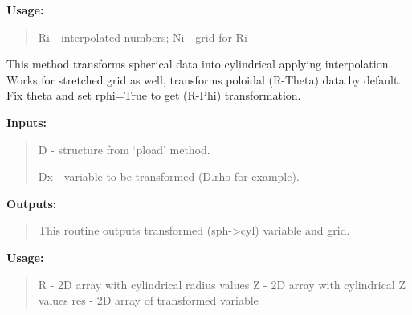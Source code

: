 \documentclass[letterpaper,10pt,english]{sphinxmanual}
\begin{document}
\begin{fulllineitems}
\begin{fulllineitems}
\textbf{Usage:}
\begin{quote}








Ri - interpolated numbers;
Ni - grid for Ri
\end{quote}

\end{fulllineitems}


\begin{fulllineitems}
\label{tools:pyPLUTO.Tools.sph2cyl}
This method transforms spherical data into cylindrical applying interpolation. Works for stretched grid as well, transforms poloidal (R-Theta) data by default. Fix theta and set rphi=True to get (R-Phi) transformation.

\textbf{Inputs:}
\begin{quote}

D  - structure  from `pload' method.

Dx - variable to be transformed (D.rho for example).
\end{quote}

\textbf{Outputs:}
\begin{quote}

This routine outputs transformed (sph-\textgreater{}cyl) variable and grid.
\end{quote}

\textbf{Usage:}
\begin{quote}






R - 2D array with cylindrical radius values
Z - 2D array with cylindrical Z values
res - 2D array of transformed variable
\end{quote}

\end{fulllineitems}


\end{fulllineitems}
\end{document}
